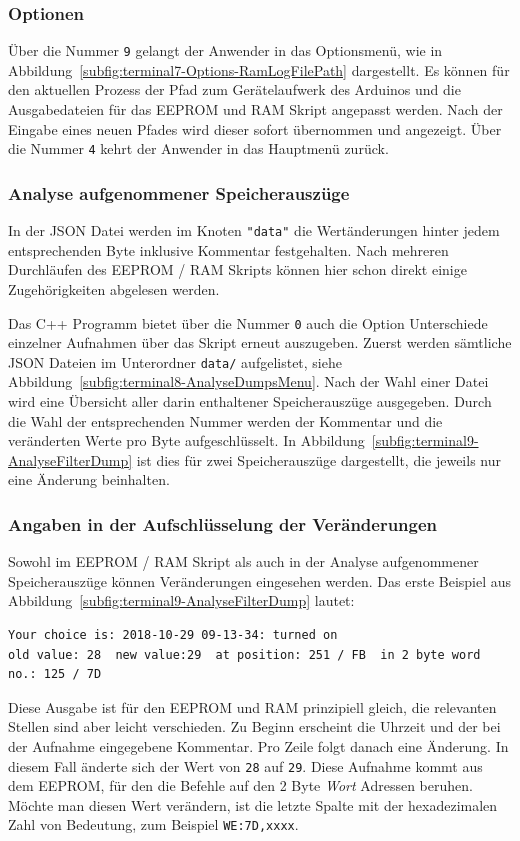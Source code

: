 \subsubsection{Optionen}
Über die Nummer \texttt{9} gelangt der Anwender in das Optionsmenü, wie in Abbildung~\ref{subfig:terminal7-Options-RamLogFilePath} dargestellt.
Es können für den aktuellen Prozess der Pfad zum Gerätelaufwerk des Arduinos und die Ausgabedateien für das \ac{EEPROM} und \ac{RAM} Skript angepasst werden.
Nach der Eingabe eines neuen Pfades wird dieser sofort übernommen und angezeigt.
Über die Nummer \texttt{4} kehrt der Anwender in das Hauptmenü zurück.

\subsubsection{Analyse aufgenommener Speicherauszüge}
In der \ac{JSON} Datei werden im Knoten \texttt{"data"} die Wertänderungen hinter jedem entsprechenden Byte inklusive Kommentar festgehalten.
Nach mehreren Durchläufen des \ac{EEPROM} / \ac{RAM} Skripts können hier schon direkt einige Zugehörigkeiten abgelesen werden.

Das C++ Programm bietet über die Nummer \texttt{0} auch die Option Unterschiede einzelner Aufnahmen über das Skript erneut auszugeben.
Zuerst werden sämtliche \ac{JSON} Dateien im Unterordner \texttt{data/} aufgelistet, siehe Abbildung~\ref{subfig:terminal8-AnalyseDumpsMenu}.
Nach der Wahl einer Datei wird eine Übersicht aller darin enthaltener Speicherauszüge ausgegeben.
Durch die Wahl der entsprechenden Nummer werden der Kommentar und die veränderten Werte pro Byte aufgeschlüsselt.
In Abbildung~\ref{subfig:terminal9-AnalyseFilterDump} ist dies für zwei Speicherauszüge dargestellt, die jeweils nur eine Änderung beinhalten.

\subsubsection{Angaben in der Aufschlüsselung der Veränderungen}
Sowohl im \ac{EEPROM} / \ac{RAM} Skript als auch in der Analyse aufgenommener Speicherauszüge können Veränderungen eingesehen werden.
Das erste Beispiel aus Abbildung~\ref{subfig:terminal9-AnalyseFilterDump} lautet:
\begin{lstlisting}[label=lst:dumpChanges,caption={Beispiel einer Abweichung zweier Speicherauszüge}]
Your choice is: 2018-10-29 09-13-34: turned on
old value: 28  new value:29  at position: 251 / FB  in 2 byte word no.: 125 / 7D
\end{lstlisting}
Diese Ausgabe ist für den \ac{EEPROM} und \ac{RAM} prinzipiell gleich, die relevanten Stellen sind aber leicht verschieden.
Zu Beginn erscheint die Uhrzeit und der bei der Aufnahme eingegebene Kommentar.
Pro Zeile folgt danach eine Änderung.
In diesem Fall änderte sich der Wert von \texttt{28} auf \texttt{29}.
Diese Aufnahme kommt aus dem \ac{EEPROM}, für den die Befehle auf den 2 Byte \textit{Wort} Adressen beruhen.
Möchte man diesen Wert verändern, ist die letzte Spalte mit der hexadezimalen Zahl von Bedeutung, zum Beispiel \texttt{WE:7D,xxxx}.

